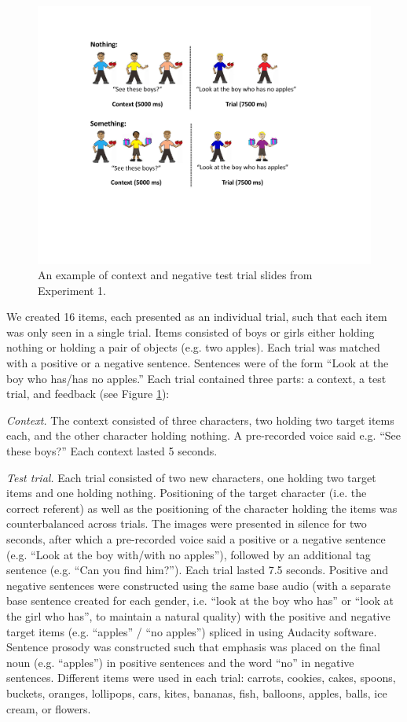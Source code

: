 \documentclass[man]{apa2}
\begin{document}
\begin{figure}
\begin{center} 
\includegraphics[width=5in]{trialfigure_nothing.pdf}
\caption{\label{fig:e1stim} An example of context and negative test trial slides from Experiment 1. }
\end{center} 
\end{figure}

We created 16 items, each presented as an individual trial, such that each item was only seen in a single trial.  Items consisted of boys or girls either holding nothing or holding a pair of objects (e.g. two apples).  Each trial was matched with a positive or a negative sentence.  Sentences were of the form ``Look at the boy who has/has no apples.''  Each trial contained three parts: a context, a test trial, and feedback (see Figure \ref{fig:e1stim}):

\emph{Context.}  The context consisted of three characters, two holding two target items each, and the other character holding nothing.  A pre-recorded voice said e.g. ``See these boys?''  Each context lasted 5 seconds.  

\emph{Test trial.}  Each trial consisted of two new characters, one holding two target items and one holding nothing.  Positioning of the target character (i.e. the correct referent) as well as the positioning of the character holding the items was counterbalanced across trials.  The images were presented in silence for two seconds, after which a pre-recorded voice said a positive or a negative sentence (e.g. ``Look at the boy with/with no apples''), followed by an additional tag sentence (e.g. ``Can you find him?''). Each trial lasted 7.5 seconds. Positive and negative sentences were constructed using the same base audio (with a separate base sentence created for each gender, i.e. ``look at the boy who has'' or ``look at the girl who has'', to maintain a natural quality) with the positive and negative target items (e.g. ``apples'' / ``no apples'') spliced in using Audacity software.  Sentence prosody was constructed such that emphasis was placed on the final noun (e.g. ``apples'') in positive sentences and the word ``no'' in negative sentences.  Different items were used in each trial: carrots, cookies, cakes, spoons, buckets, oranges, lollipops, cars, kites, bananas, fish, balloons, apples, balls, ice cream, or flowers.
\end{document}
